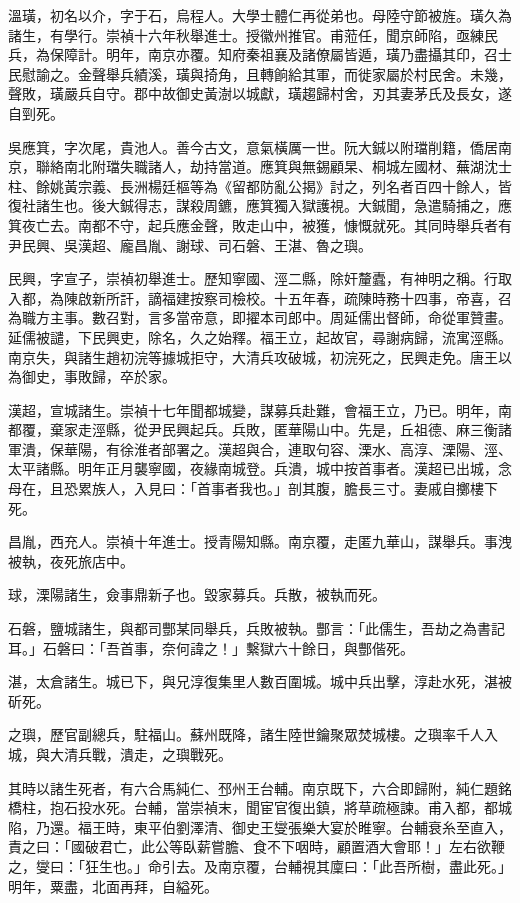 \begin{pinyinscope}
{{溫璜，初名以介，字于石，烏程人。大學士體仁再從弟也。母陸守節被旌。璜久為諸生，有學行。崇禎十六年秋舉進士。授徽州推官。甫蒞任，聞京師陷，亟練民兵，為保障計。明年，南京亦覆。知府秦祖襄及諸僚屬皆遁，璜乃盡攝其印，召士民慰諭之。金聲舉兵績溪，璜與掎角，且轉餉給其軍，而徙家屬於村民舍。未幾，聲敗，璜嚴兵自守。郡中故御史黃澍以城獻，璜趨歸村舍，刃其妻茅氏及長女，遂自剄死。

吳應箕，字次尾，貴池人。善今古文，意氣橫厲一世。阮大鋮以附璫削籍，僑居南京，聯絡南北附璫失職諸人，劫持當道。應箕與無錫顧杲、桐城左國材、蕪湖沈士柱、餘姚黃宗義、長洲楊廷樞等為《留都防亂公揭》討之，列名者百四十餘人，皆復社諸生也。後大鋮得志，謀殺周鑣，應箕獨入獄護視。大鋮聞，急遣騎捕之，應箕夜亡去。南都不守，起兵應金聲，敗走山中，被獲，慷慨就死。其同時舉兵者有尹民興、吳漢超、龐昌胤、謝球、司石磐、王湛、魯之璵。

民興，字宣子，崇禎初舉進士。歷知寧國、涇二縣，除奸釐蠹，有神明之稱。行取入都，為陳啟新所訐，謫福建按察司檢校。十五年春，疏陳時務十四事，帝喜，召為職方主事。數召對，言多當帝意，即擢本司郎中。周延儒出督師，命從軍贊畫。延儒被譴，下民興吏，除名，久之始釋。福王立，起故官，尋謝病歸，流寓涇縣。南京失，與諸生趙初浣等據城拒守，大清兵攻破城，初浣死之，民興走免。唐王以為御史，事敗歸，卒於家。

漢超，宣城諸生。崇禎十七年聞都城變，謀募兵赴難，會福王立，乃已。明年，南都覆，棄家走涇縣，從尹民興起兵。兵敗，匿華陽山中。先是，丘祖德、麻三衡諸軍潰，保華陽，有徐淮者部署之。漢超與合，連取句容、溧水、高淳、溧陽、涇、太平諸縣。明年正月襲寧國，夜緣南城登。兵潰，城中按首事者。漢超已出城，念母在，且恐累族人，入見曰：「首事者我也。」剖其腹，膽長三寸。妻戚自擲樓下死。

昌胤，西充人。崇禎十年進士。授青陽知縣。南京覆，走匿九華山，謀舉兵。事洩被執，夜死旅店中。

球，溧陽諸生，僉事鼎新子也。毀家募兵。兵散，被執而死。

石磐，鹽城諸生，與都司酆某同舉兵，兵敗被執。酆言：「此儒生，吾劫之為書記耳。」石磐曰：「吾首事，奈何諱之！」繫獄六十餘日，與酆偕死。

湛，太倉諸生。城已下，與兄淳復集里人數百圍城。城中兵出擊，淳赴水死，湛被斫死。

之璵，歷官副總兵，駐福山。蘇州既降，諸生陸世鑰聚眾焚城樓。之璵率千人入城，與大清兵戰，潰走，之璵戰死。

其時以諸生死者，有六合馬純仁、邳州王台輔。南京既下，六合即歸附，純仁題銘橋柱，抱石投水死。台輔，當崇禎末，聞宦官復出鎮，將草疏極諫。甫入都，都城陷，乃還。福王時，東平伯劉澤清、御史王燮張樂大宴於睢寧。台輔衰糸至直入，責之曰：「國破君亡，此公等臥薪嘗膽、食不下咽時，顧置酒大會耶！」左右欲鞭之，燮曰：「狂生也。」命引去。及南京覆，台輔視其廩曰：「此吾所樹，盡此死。」明年，粟盡，北面再拜，自縊死。

}}
\end{pinyinscope}
